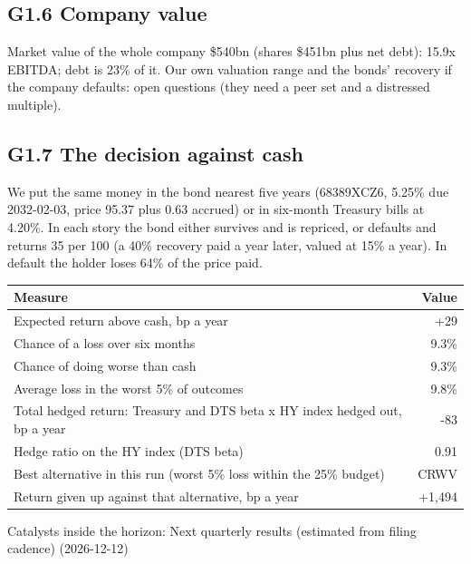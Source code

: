 \documentclass[11pt,a4paper]{article}
\begin{document}
\subsection*{G1.6 Company value}
Market value of the whole company \$540bn (shares \$451bn plus net debt): 15.9x EBITDA; debt is 23\% of it. Our own valuation range and the bonds' recovery if the company defaults: open questions (they need a peer set and a distressed multiple).
\subsection*{G1.7 The decision against cash}
We put the same money in the bond nearest five years (68389XCZ6, 5.25\% due 2032-02-03, price 95.37 plus 0.63 accrued) or in six-month Treasury bills at 4.20\%. In each story the bond either survives and is repriced, or defaults and returns 35 per 100 (a 40\% recovery paid a year later, valued at 15\% a year). In default the holder loses 64\% of the price paid.
\begin{center}\footnotesize\setlength{\tabcolsep}{3.5pt}\begin{tabular}{@{}lr@{}}\toprule
Measure & Value \\\midrule
Expected return above cash, bp a year & +29 \\
Chance of a loss over six months & 9.3\% \\
Chance of doing worse than cash & 9.3\% \\
Average loss in the worst 5\% of outcomes & 9.8\% \\
Total hedged return: Treasury and DTS beta x HY index hedged out, bp a year & -83 \\
Hedge ratio on the HY index (DTS beta) & 0.91 \\
Best alternative in this run (worst 5\% loss within the 25\% budget) & CRWV \\
Return given up against that alternative, bp a year & +1,494 \\
\bottomrule\end{tabular}\end{center}
Catalysts inside the horizon: Next quarterly results (estimated from filing cadence) (2026-12-12)
\end{document}
